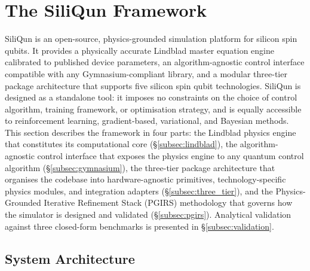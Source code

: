 
\section{The SiliQun Framework}
\label{sec:framework}

SiliQun is an open-source, physics-grounded simulation platform for silicon spin qubits.
It provides a physically accurate Lindblad master equation engine calibrated to published device parameters, an algorithm-agnostic control interface compatible with any Gymnasium-compliant library, and a modular three-tier package architecture that supports five silicon spin qubit technologies.
SiliQun is designed as a standalone tool: it imposes no constraints on the choice of control algorithm, training framework, or optimisation strategy, and is equally accessible to reinforcement learning, gradient-based, variational, and Bayesian methods.
This section describes the framework in four parts: the Lindblad physics engine that constitutes its computational core (\S\ref{subsec:lindblad}), the algorithm-agnostic control interface that exposes the physics engine to any quantum control algorithm (\S\ref{subsec:gymnasium}), the three-tier package architecture that organises the codebase into hardware-agnostic primitives, technology-specific physics modules, and integration adapters (\S\ref{subsec:three_tier}), and the Physics-Grounded Iterative Refinement Stack (PGIRS) methodology that governs how the simulator is designed and validated (\S\ref{subsec:pgirs}). Analytical validation against three closed-form benchmarks is presented in \S\ref{subsec:validation}.

\subsection{System Architecture}
\label{subsec:sdqf_arch}

